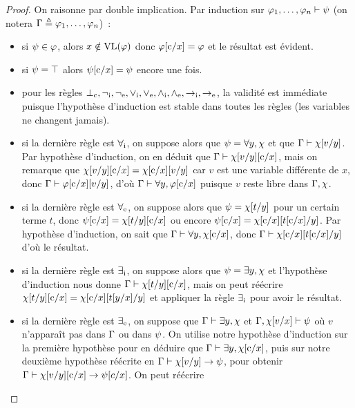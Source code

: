 \begin{proof}
  On raisonne par double implication. Par induction sur
  $\varphi_1,\ldots,\varphi_n\vdash \psi$
  (on notera $\Gamma \triangleq \varphi_1,\ldots,\varphi_n$)~:
  \begin{itemize}
  \item si $\psi\in \varphi$, alors $x\notin\operatorname{VL}(\varphi)$ donc
    $\varphi[\mathrm{c}/x]=\varphi$ et le résultat est évident.
  \item si $\psi = \top$ alors $\psi[\mathrm{c}/x]=\psi$ encore une fois.
  \item pour les règles
    $\bot_{\mathrm{c}},\mathord{\lnot}_{\mathrm{i}},\mathord{\lnot}_{\mathrm{e}},\mathord{\lor}_{\mathrm{i}},\mathord{\lor}_{\mathrm{e}},\mathord{\land}_{\mathrm{i}},\mathord{\land}_{\mathrm{e}},\mathord{\to}_{\mathrm{i}},\mathord{\to}_{\mathrm{e}}$, la
    validité est immédiate puisque l'hypothèse d'induction est stable dans
    toutes les règles (les variables ne changent jamais).
  \item si la dernière règle est $\mathord{\forall}_{\mathrm{i}}$, on suppose alors que
    $\psi = \forall y, \chi$ et que $\Gamma\vdash \chi[v/y]$.
    Par hypothèse d'induction,
    on en déduit que $\Gamma\vdash \chi[v/y][\mathrm{c}/x]$, mais on remarque que
    $\chi[v/y][\mathrm{c}/x] = \chi[\mathrm{c}/x][v/y]$
    car $v$ est une variable différente de $x$,
    donc $\Gamma\vdash\varphi[\mathrm{c}/x][v/y]$,
    d'où $\Gamma\vdash\forall y,\varphi[\mathrm{c}/x]$
    puisque $v$ reste libre dans $\Gamma,\chi$.
  \item si la dernière règle est $\mathord{\forall}_{\mathrm{e}}$, on suppose alors que
    $\psi = \chi[t/y]$ pour un certain terme $t$, donc
    $\psi[\mathrm{c}/x] = \chi[t/y][\mathrm{c}/x]$ ou
    encore $\psi[\mathrm{c}/x] = \chi[\mathrm{c}/x][t[\mathrm{c}/x]/y]$.
    Par hypothèse d'induction, on sait que
    $\Gamma\vdash \forall y, \chi[\mathrm{c}/x]$, donc
    $\Gamma\vdash \chi[\mathrm{c}/x][t[\mathrm{c}/x]/y]$ d'où le résultat.
  \item si la dernière règle est $\mathord{\exists}_{\mathrm{i}}$, on suppose alors que
    $\psi = \exists y, \chi$ et l'hypothèse d'induction nous donne
    $\Gamma\vdash \chi[t/y][\mathrm{c}/x]$, mais on peut réécrire
    $\chi[t/y][\mathrm{c}/x] = \chi[\mathrm{c}/x][t[y/x]/y]$
    et appliquer la règle $\mathord{\exists}_{\mathrm{i}}$ pour avoir le résultat.
  \item si la dernière règle est $\mathord{\exists}_{\mathrm{e}}$, on suppose que
    $\Gamma\vdash \exists y, \chi$ et $\Gamma, \chi[v/x]\vdash \psi$
    où $v$ n'apparaît
    pas dans $\Gamma$ ou dans $\psi$.
    On utilise notre hypothèse d'induction sur
    la première hypothèse pour en déduire que
    $\Gamma\vdash \exists y, \chi[\mathrm{c}/x]$,
    puis sur notre deuxième hypothèse réécrite en
    $\Gamma\vdash \chi[v/y]\to \psi$,
    pour obtenir $\Gamma\vdash \chi[v/y][\mathrm{c}/x]\to \psi[c/x]$. On peut
    réécrire

\end{itemize}
\end{proof}

